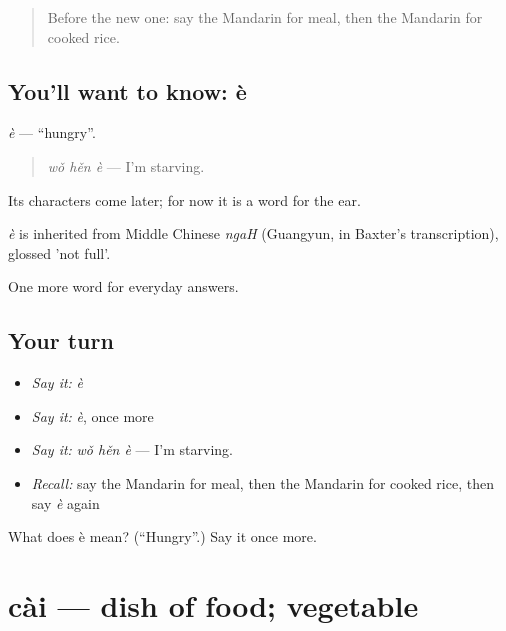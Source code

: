 \label{lesson:ZH-C38-e}



\begin{quote}
Before the new one: say the Mandarin for meal, then the Mandarin for cooked rice.
\end{quote}

\subsection*{You'll want to know: è}
\emph{è} — \textquotedblleft{}hungry\textquotedblright{}.

\begin{quote}
\emph{wǒ hěn è} — I'm starving.
\end{quote}

Its characters come later; for now it is a word for the ear.

\begin{cousinweb}
\emph{è} is inherited from Middle Chinese \emph{ngaH} (Guangyun, in Baxter's transcription), glossed 'not full'.
\end{cousinweb}

\begin{grammarlens}[title={What you've built}]
One more word for everyday answers.
\end{grammarlens}

\subsection*{Your turn}
\begin{itemize}
\raggedright
  \item \emph{Say it:} \emph{è}
  \item \emph{Say it:} \emph{è}, once more
  \item \emph{Say it:} \emph{wǒ hěn è} — I'm starving.
  \item \emph{Recall:} say the Mandarin for meal, then the Mandarin for cooked rice, then say \emph{è} again
\end{itemize}

\begin{tcolorbox}[breakable,colback=teal!4,colframe=teal!35!black,title={Before you move on}]
What does è mean? (\textquotedblleft{}Hungry\textquotedblright{}.) Say it once more.
\end{tcolorbox}
\section[cài]{cài — dish of food; vegetable}

